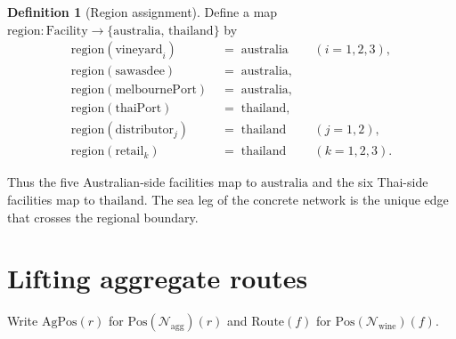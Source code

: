\documentclass[11pt,a4paper]{article}
\theoremstyle{plain}
\theoremstyle{definition}
\newtheorem{definition}[theorem]{Definition}
\newcommand{\Pos}{\mathrm{Pos}}
\begin{document}
\begin{definition}[Region assignment]\label{def:region}
Define a map $\mathrm{region} : \mathrm{Facility} \to
\{\mathrm{australia},\, \mathrm{thailand}\}$ by
\begin{align*}
  \mathrm{region}(\mathrm{vineyard}_i)
  &\;=\; \mathrm{australia}
    &&(i=1,2,3), \\
  \mathrm{region}(\mathrm{sawasdee})
  &\;=\; \mathrm{australia}, \\
  \mathrm{region}(\mathrm{melbournePort})
  &\;=\; \mathrm{australia}, \\
  \mathrm{region}(\mathrm{thaiPort})
  &\;=\; \mathrm{thailand}, \\
  \mathrm{region}(\mathrm{distributor}_j)
  &\;=\; \mathrm{thailand}
    &&(j=1,2), \\
  \mathrm{region}(\mathrm{retail}_k)
  &\;=\; \mathrm{thailand}
    &&(k=1,2,3).
\end{align*}
\end{definition}

Thus the five Australian-side facilities map to $\mathrm{australia}$ and the
six Thai-side facilities map to $\mathrm{thailand}$. The sea leg of the
concrete network is the unique edge that crosses the regional boundary.

\section{Lifting aggregate routes}

Write $\mathrm{AgPos}(r)$ for $\Pos(\mathcal{N}_{\mathrm{agg}})(r)$ and
$\mathrm{Route}(f)$ for $\Pos(\mathcal{N}_{\mathrm{wine}})(f)$.
\end{document}
